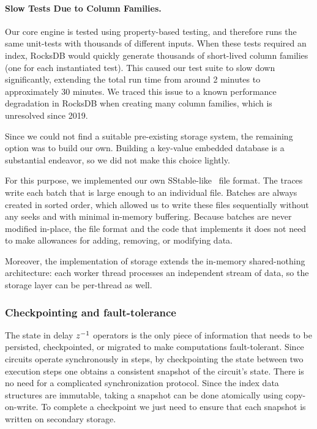 \paragraph{Slow Tests Due to Column Families.} Our core engine is tested
using property-based testing, and therefore runs the same unit-tests
with thousands of different inputs.  When these tests required an
index, RocksDB would quickly generate thousands of short-lived column
families (one for each instantiated test).  This caused our test suite
to slow down significantly, extending the total run time from around 2
minutes to approximately 30 minutes.  We traced this issue to a known
performance degradation in RocksDB when creating many column families,
which is unresolved since 2019.

Since we could not find a suitable pre-existing storage system, the
remaining option was to build our own. Building a key-value embedded
database is a substantial endeavor, so we did not make this choice
lightly.

For this purpose, we implemented our own
SStable-like~\cite{chang-tcs08} file format. The traces write each
batch that is large enough to an individual file.  Batches are always
created in sorted order, which allowed us to write these files
sequentially without any seeks and with minimal in-memory buffering.
Because batches are never modified in-place, the file format and the
code that implements it does not need to make allowances for adding,
removing, or modifying data.

Moreover, the implementation of storage extends the in-memory
shared-nothing architecture: each worker thread processes an
independent stream of data, so the storage layer can be per-thread as
well.

\subsubsection{Checkpointing and fault-tolerance}

The state in delay $z^{-1}$ operators is the only piece of information
that needs to be persisted, checkpointed, or migrated to make \dbsp
computations fault-tolerant.  Since \dbsp circuits operate
synchronously in steps, by checkpointing the state between two
execution steps one obtains a consistent snapshot of the circuit's
state.  There is no need for a complicated synchronization protocol.
Since the index data structures are immutable, taking a snapshot can
be done atomically using copy-on-write.  To complete a checkpoint we
just need to ensure that each snapshot is written on secondary
storage.

